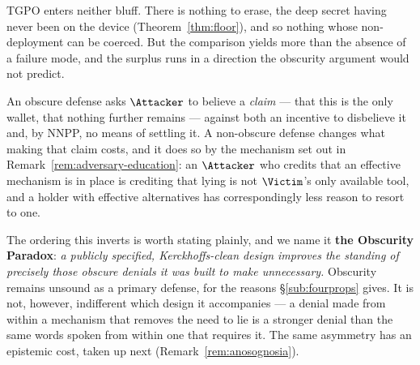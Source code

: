 \begin{remark}
\label{rem:obscurity-paradox}
TGPO enters neither bluff. There is nothing to erase, the deep secret having
never been on the device (Theorem~\ref{thm:floor}), and so nothing whose
non-deployment can be coerced. But the comparison yields more than the absence
of a failure mode, and the surplus runs in a direction the obscurity argument
would not predict.

An obscure defense asks $\Attacker$ to believe a \emph{claim} --- that this is
the only wallet, that nothing further remains --- against both an incentive to
disbelieve it and, by NNPP, no means of settling it. A non-obscure defense
changes what making that claim costs, and it does so by the mechanism set out in
Remark~\ref{rem:adversary-education}: an $\Attacker$ who credits that an
effective mechanism is in place is crediting that lying is not $\Victim$'s only
available tool, and a holder with effective alternatives has correspondingly
less reason to resort to one.

The ordering this inverts is worth stating plainly, and we name it \textbf{the
Obscurity Paradox}: \emph{a publicly specified, Kerckhoffs-clean design improves
the standing of precisely those obscure denials it was built to make
unnecessary.} Obscurity remains unsound as a primary defense, for the reasons
\S\ref{sub:fourprops} gives. It is not, however, indifferent which design it
accompanies --- a denial made from within a mechanism that removes the need to
lie is a stronger denial than the same words spoken from within one that
requires it. The same asymmetry has an epistemic cost, taken up next
(Remark~\ref{rem:anosognosia}).
\end{remark}

